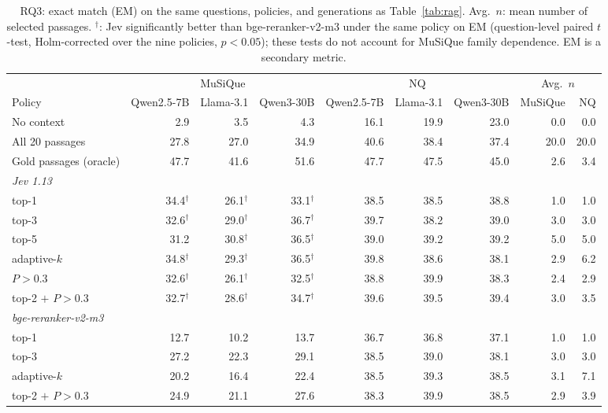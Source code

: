 \begin{table}[t]
\centering
\footnotesize
\setlength{\tabcolsep}{4pt}
\caption{RQ3: exact match (EM) on the same questions, policies, and generations as Table~\ref{tab:rag}. Avg.\ $n$: mean number of selected passages. $^\dagger$: Jev significantly better than bge-reranker-v2-m3 under the same policy on EM (question-level paired $t$-test, Holm-corrected over the nine policies, $p<0.05$); these tests do not account for MuSiQue family dependence. EM is a secondary metric.}
\label{tab:rag-em}
\begin{tabular}{lrrrrrrrr}
\toprule
 & \multicolumn{3}{c}{MuSiQue} & \multicolumn{3}{c}{NQ} & \multicolumn{2}{c}{Avg.\ $n$} \\
Policy & Qwen2.5-7B & Llama-3.1 & Qwen3-30B & Qwen2.5-7B & Llama-3.1 & Qwen3-30B & MuSiQue & NQ \\
\midrule
No context & 2.9 & 3.5 & 4.3 & 16.1 & 19.9 & 23.0 & 0.0 & 0.0 \\
All 20 passages & 27.8 & 27.0 & 34.9 & 40.6 & 38.4 & 37.4 & 20.0 & 20.0 \\
Gold passages (oracle) & 47.7 & 41.6 & 51.6 & 47.7 & 47.5 & 45.0 & 2.6 & 3.4 \\
\multicolumn{9}{l}{\textit{Jev 1.13}} \\
\quad top-1 & 34.4$^\dagger$ & 26.1$^\dagger$ & 33.1$^\dagger$ & 38.5 & 38.5 & 38.8 & 1.0 & 1.0 \\
\quad top-3 & 32.6$^\dagger$ & 29.0$^\dagger$ & 36.7$^\dagger$ & 39.7 & 38.2 & 39.0 & 3.0 & 3.0 \\
\quad top-5 & 31.2 & 30.8$^\dagger$ & 36.5$^\dagger$ & 39.0 & 39.2 & 39.2 & 5.0 & 5.0 \\
\quad adaptive-$k$ & 34.8$^\dagger$ & 29.3$^\dagger$ & 36.5$^\dagger$ & 39.8 & 38.6 & 38.1 & 2.9 & 6.2 \\
\quad $P>0.3$ & 32.6$^\dagger$ & 26.1$^\dagger$ & 32.5$^\dagger$ & 38.8 & 39.9 & 38.3 & 2.4 & 2.9 \\
\quad top-2 $+$ $P>0.3$ & 32.7$^\dagger$ & 28.6$^\dagger$ & 34.7$^\dagger$ & 39.6 & 39.5 & 39.4 & 3.0 & 3.5 \\
\multicolumn{9}{l}{\textit{bge-reranker-v2-m3}} \\
\quad top-1 & 12.7 & 10.2 & 13.7 & 36.7 & 36.8 & 37.1 & 1.0 & 1.0 \\
\quad top-3 & 27.2 & 22.3 & 29.1 & 38.5 & 39.0 & 38.1 & 3.0 & 3.0 \\
\quad adaptive-$k$ & 20.2 & 16.4 & 22.4 & 38.5 & 39.3 & 38.5 & 3.1 & 7.1 \\
\quad top-2 $+$ $P>0.3$ & 24.9 & 21.1 & 27.6 & 38.3 & 39.9 & 38.5 & 2.9 & 3.9 \\

\end{tabular}
\end{table}
